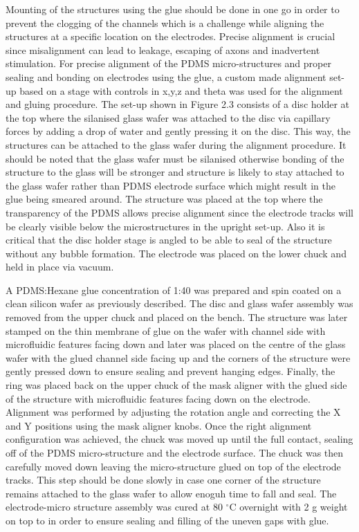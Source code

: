 \documentclass{book}
\begin{document}
Mounting of the structures using the glue should be done in one go in order to prevent the clogging of the channels which is a challenge while aligning the structures at a specific location on the electrodes. Precise alignment is crucial since misalignment can lead to leakage, escaping of axons and inadvertent stimulation. For precise alignment of the PDMS micro-structures and proper sealing and bonding on electrodes using the glue, a custom made alignment set-up based on a stage with controls in x,y,z and theta was used for the alignment and gluing procedure. The set-up shown in Figure 2.3 consists of a disc holder at the top where the silanised glass wafer was attached to the disc via capillary forces by adding a drop of water and gently pressing it on the disc. This way, the structures can be attached to the glass wafer during the alignment procedure. It should be noted that the glass wafer must be silanised otherwise bonding of the structure to the glass will be stronger and structure is likely to stay attached to the glass wafer rather than PDMS electrode surface which might result in the glue being smeared around. The structure was placed at the top where the transparency of the PDMS allows precise alignment since the electrode tracks will be clearly visible below the microstructures in the upright set-up. Also it is critical that the disc holder stage is angled to be able to seal of the structure without any bubble formation. The electrode was placed on the lower chuck and held in place via vacuum. 



A PDMS:Hexane glue concentration of 1:40 was prepared and spin coated on a clean silicon wafer as previously described. The disc and glass wafer assembly was removed from the upper chuck and placed on the bench. The structure was later stamped on the thin membrane of glue on the wafer with channel side with microfluidic features facing down and later was placed on the centre of the glass wafer with the glued channel side facing up and the corners of the structure were gently pressed down to ensure sealing and prevent hanging edges. Finally, the ring was placed back on the upper chuck of the mask aligner with the glued side of the structure with microfluidic features facing down on the electrode. Alignment was performed by adjusting the rotation angle and correcting the X and Y positions using the mask aligner knobs. Once the right alignment configuration was achieved, the chuck was moved up until the full contact, sealing off of the PDMS micro-structure and the electrode surface. The chuck was then carefully moved down leaving the micro-structure glued on top of the electrode tracks. This step should be done slowly in case one corner of the structure remains attached to the glass wafer to allow enoguh time to fall and seal. The electrode-micro structure assembly was cured at 80 $^{\circ}$C overnight with 2 g weight on top to in order to ensure sealing and filling of the uneven gaps with glue.
\end{document}
